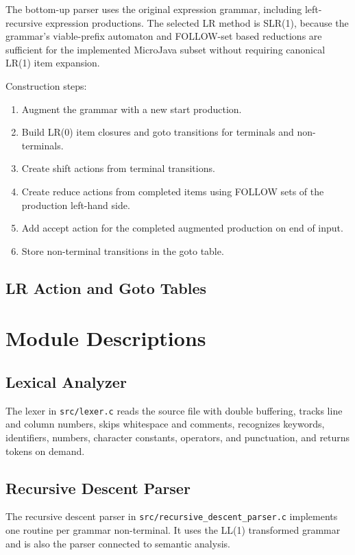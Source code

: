 \documentclass[12pt,a4paper]{article}
\begin{document}
The bottom-up parser uses the original expression grammar, including left-recursive expression productions. The selected LR method is SLR(1), because the grammar's viable-prefix automaton and FOLLOW-set based reductions are sufficient for the implemented MicroJava subset without requiring canonical LR(1) item expansion.

Construction steps:
\begin{enumerate}
  \item Augment the grammar with a new start production.
  \item Build LR(0) item closures and goto transitions for terminals and non-terminals.
  \item Create shift actions from terminal transitions.
  \item Create reduce actions from completed items using FOLLOW sets of the production left-hand side.
  \item Add accept action for the completed augmented production on end of input.
  \item Store non-terminal transitions in the goto table.
\end{enumerate}

\subsection{LR Action and Goto Tables}


\section{Module Descriptions}

\subsection{Lexical Analyzer}
The lexer in \texttt{src/lexer.c} reads the source file with double buffering, tracks line and column numbers, skips whitespace and comments, recognizes keywords, identifiers, numbers, character constants, operators, and punctuation, and returns tokens on demand.

\subsection{Recursive Descent Parser}
The recursive descent parser in \texttt{src/recursive\_descent\_parser.c} implements one routine per grammar non-terminal. It uses the LL(1) transformed grammar and is also the parser connected to semantic analysis.
\end{document}

